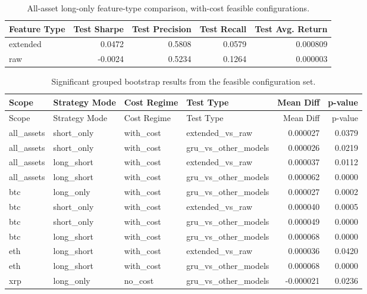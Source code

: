 \documentclass[12pt]{article}
\begin{document}
\begin{table}[H]
\centering
\caption{All-asset long-only feature-type comparison, with-cost feasible configurations.}
\label{tab:appendix_table11_withcost}
\begingroup
\singlespacing
\begin{tabular}{lrrrr}
\toprule
Feature Type & Test Sharpe & Test Precision & Test Recall & Test Avg. Return \\
\midrule
extended & 0.0472 & 0.5808 & 0.0579 & 0.000809 \\
raw & -0.0024 & 0.5234 & 0.1264 & 0.000003 \\
\bottomrule
\end{tabular}
\endgroup
\end{table}

\begingroup
\small
\singlespacing
\begin{longtable}{llllrr}
\caption{Significant grouped bootstrap results from the feasible configuration set.}
\label{tab:appendix_sigtests}\\
\toprule
Scope & Strategy Mode & Cost Regime & Test Type & Mean Diff & p-value \\
\midrule
\endfirsthead
\toprule
Scope & Strategy Mode & Cost Regime & Test Type & Mean Diff & p-value \\
\midrule
\endhead
all\_assets & short\_only & with\_cost & extended\_vs\_raw & 0.000027 & 0.0379 \\
all\_assets & short\_only & with\_cost & gru\_vs\_other\_models & 0.000026 & 0.0219 \\
all\_assets & long\_short & with\_cost & extended\_vs\_raw & 0.000037 & 0.0112 \\
all\_assets & long\_short & with\_cost & gru\_vs\_other\_models & 0.000062 & 0.0000 \\
btc & long\_only & with\_cost & gru\_vs\_other\_models & 0.000027 & 0.0002 \\
btc & short\_only & with\_cost & extended\_vs\_raw & 0.000040 & 0.0005 \\
btc & short\_only & with\_cost & gru\_vs\_other\_models & 0.000049 & 0.0000 \\
btc & long\_short & with\_cost & gru\_vs\_other\_models & 0.000068 & 0.0000 \\
eth & long\_short & with\_cost & extended\_vs\_raw & 0.000036 & 0.0420 \\
eth & long\_short & with\_cost & gru\_vs\_other\_models & 0.000068 & 0.0000 \\
xrp & long\_only & no\_cost & gru\_vs\_other\_models & -0.000021 & 0.0236 \\
\bottomrule
\end{longtable}
\endgroup
\end{document}
